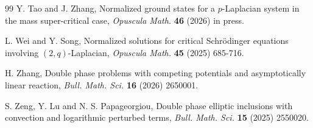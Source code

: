 \documentclass[leqno,12pt]{article}
\numberwithin{equation}{section}
\begin{document}
\begin{thebibliography}{99}
 Y. Tao and J. Zhang, 
Normalized ground states for a $p$-Laplacian system in the mass super-critical case, 
{\it Opuscula Math.} {\bf 46} (2026) in press.

 L. Wei and  Y. Song, Normalized solutions for critical Schrödinger equations involving $(2,q)$-Laplacian, {\it Opuscula Math.} {\bf 45} (2025) 685-716. 

 H. Zhang, Double phase problems with competing potentials
and asymptotically linear reaction, {\it  Bull. Math. Sci.} {\bf  16} (2026) 2650001. 

 S. Zeng, Y. Lu and N. S. Papageorgiou, Double phase elliptic inclusions with convection and logarithmic perturbed terms, {\it Bull. Math. Sci.} {\bf 15} (2025)  2550020. 

\end{thebibliography}
\end{document}
